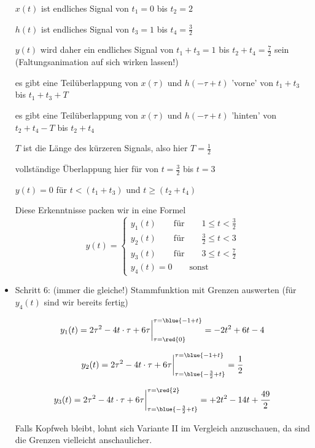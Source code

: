 \begin{ExCalc}
\begin{itemize}
  $x(t)$ ist endliches Signal von $t_1=0$ bis $t_2=2$

  $h(t)$ ist endliches Signal von $t_3=1$ bis $t_4=\frac{3}{2}$

  $y(t)$ wird daher ein endliches Signal von $t_1+t_3=1$ bis $t_2+t_4=\frac{7}{2}$ sein
  (Faltungsanimation auf sich wirken lassen!)

  es gibt eine Teilüberlappung von $x(\tau)$ und $h(-\tau+t)$  'vorne' von
  $t_1+t_3$ bis $t_1+t_3+T$

  es gibt eine Teilüberlappung von $x(\tau)$ und $h(-\tau+t)$  'hinten' von
  $t_2+t_4-T$ bis $t_2+t_4$

  $T$ ist die Länge des kürzeren Signals, also hier $T=\frac{1}{2}$

  vollständige Überlappung hier für von $t = \frac{3}{2}$ bis $t=3$

  $y(t)=0$ für $t<(t_1+t_3)$ und $t\geq(t_2+t_4)$

  Diese Erkenntnisse packen wir in eine Formel
  \begin{equation}
  y(t) =
  \begin{cases}
    y_1(t) \qquad \mathrm{für} \qquad 1 \leq t < \frac{3}{2}\\
    y_2(t) \qquad \mathrm{für} \qquad \frac{3}{2} \leq t < 3\\
    y_3(t) \qquad \mathrm{für} \qquad 3 \leq t < \frac{7}{2}\\
    y_4(t)=0 \qquad \mathrm{sonst}
  \end{cases}
  \end{equation}

  \item Schritt 6:  (immer die gleiche!)
  Stammfunktion mit Grenzen auswerten (für $y_4(t)$ sind wir bereits fertig)

  \begin{equation}
  y_1(t) = 2 \tau^2 - 4 t \cdot \tau + 6 \tau\bigg|_{\tau=\red{0}}^{\tau=\blue{-1+t}}
  = -2 t^2 + 6 t - 4
  \end{equation}

  \begin{equation}
  y_2(t) = 2 \tau^2 - 4 t \cdot \tau + 6 \tau\bigg|_{\tau=\blue{-\frac{3}{2}+t}}^{\tau=\blue{-1+t}}  = \frac{1}{2}
  \end{equation}

  \begin{equation}
  y_3(t) = 2 \tau^2 - 4 t \cdot \tau + 6 \tau\bigg|_{\tau=\blue{-\frac{3}{2}+t}}^{\tau=\red{2}} = +2 t^2 - 14 t + \frac{49}{2}
  \end{equation}

  Falls Kopfweh bleibt, lohnt sich Variante II im Vergleich anzuschauen, da
  sind die Grenzen vielleicht anschaulicher.

\end{itemize}
\end{ExCalc}


